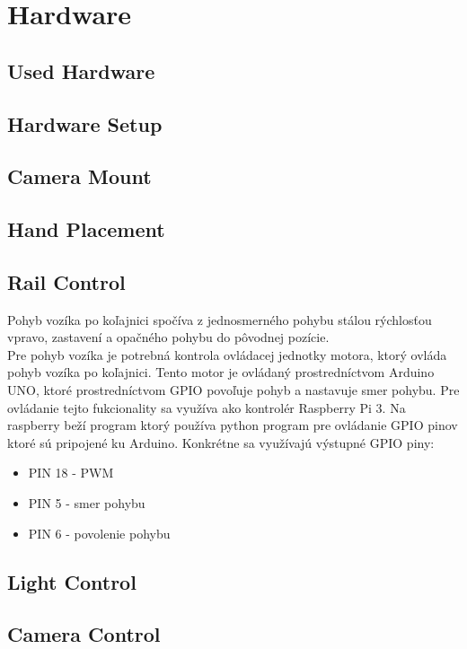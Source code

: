 \section{Hardware}
\label{sec:hw}
\subsection{Used Hardware}
\subsection{Hardware Setup}

\subsection{Camera Mount}
\subsection{Hand Placement}

\subsection{Rail Control}
Pohyb vozíka po koľajnici spočíva z jednosmerného pohybu stálou rýchlosťou vpravo, zastavení a opačného pohybu do pôvodnej pozície. \\
Pre pohyb vozíka je potrebná kontrola ovládacej jednotky motora, ktorý ovláda pohyb vozíka po koľajnici. Tento motor je ovládaný prostredníctvom Arduino UNO, ktoré prostredníctvom GPIO povoľuje pohyb a nastavuje smer pohybu. Pre ovládanie tejto fukcionality sa využíva ako kontrolér Raspberry Pi 3. Na raspberry beží program ktorý používa python program pre ovládanie GPIO pinov ktoré sú pripojené ku Arduino. Konkrétne sa využívajú výstupné GPIO piny:
\begin{itemize}
    \item PIN 18 - PWM
    \item PIN  5 - smer pohybu
    \item PIN  6 - povolenie pohybu
\end{itemize}


\subsection{Light Control}
\subsection{Camera Control}
